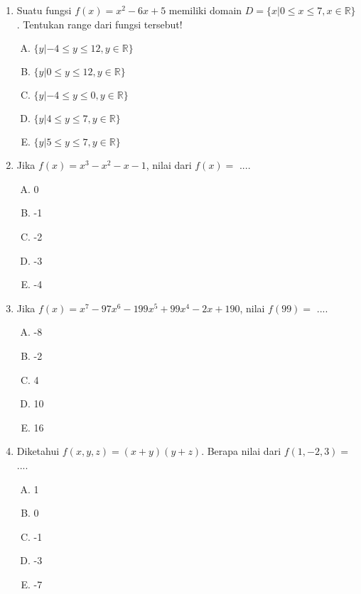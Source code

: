 \documentclass[fleqn, a4paper, 12pt]{article} %
\begin{document}
\begin{enumerate}
		\newpage
		
		\item Suatu fungsi $f(x) = x^2 - 6x + 5$ memiliki domain $D = \{x | 0 \leq x \leq 7, x \in \mathbb{R}\}$. Tentukan range dari fungsi tersebut!
			\begin{enumerate}[(A)]
				\item $\{y | -4 \leq y \leq 12, y \in \mathbb{R}\}$
				\item $\{y | 0 \leq y \leq 12, y \in \mathbb{R}\}$
				\item $\{y | -4 \leq y \leq 0, y \in \mathbb{R}\}$
				\item $\{y | 4 \leq y \leq 7, y \in \mathbb{R}\}$
				\item $\{y | 5 \leq y \leq 7, y \in \mathbb{R}\}$
			\end{enumerate}
		\item Jika $f(x) = x^3 - x^2 - x - 1$, nilai dari $f(x) = $ ....
			\begin{enumerate}[(A)]
				\item 0
				\item -1
				\item -2
				\item -3
				\item -4
			\end{enumerate}
		\item Jika $f(x) = x^7 - 97x^6 - 199x^5 + 99x^4 - 2x + 190$, nilai $f(99) = $ ....
			\begin{enumerate}[(A)]
				\item -8
				\item -2
				\item 4
				\item 10
				\item 16
			\end{enumerate}
		\item Diketahui $f(x, y, z) = (x + y)(y + z)$. Berapa nilai dari $f(1, -2, 3) = $ ....
			\begin{enumerate}[(A)]
				\item 1
				\item 0
				\item -1
				\item -3
				\item -7
			\end{enumerate}
		
		\newpage
		

\end{enumerate}
\end{document}
